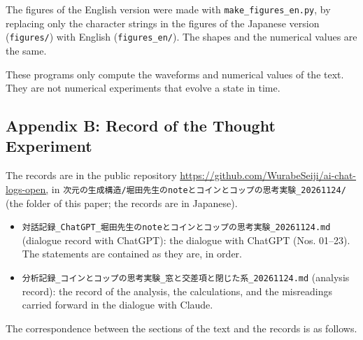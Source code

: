 \documentclass[
  a4paper,
]{article}
\providecommand{\tightlist}{%
  \setlength{\itemsep}{0pt}\setlength{\parskip}{0pt}}
\begin{document}
The figures of the English version were made with
\texttt{make\_\allowbreak{}figures\_\allowbreak{}en.py}, by replacing only the character strings
in the figures of the Japanese version (\texttt{figures/\allowbreak{}}) with English
(\texttt{figures\_\allowbreak{}en/\allowbreak{}}). The shapes and the numerical values are the
same.

These programs only compute the waveforms and numerical values of the
text. They are not numerical experiments that evolve a state in time.

\subsection{Appendix B: Record of the Thought
Experiment}\label{appendix-b-record-of-the-thought-experiment}

The records are in the public repository
\url{https://github.com/WurabeSeiji/ai-chat-logs-open,} in
\texttt{次元の生成構造/\allowbreak{}堀田先生のnoteとコインとコップの思考実験\_\allowbreak{}20261124/\allowbreak{}}
(the folder of this paper; the records are in Japanese).

\begin{itemize}
\tightlist
\item
  \texttt{対話記録\_\allowbreak{}ChatGPT\_\allowbreak{}堀田先生のnoteとコインとコップの思考実験\_\allowbreak{}20261124.md}
  (dialogue record with ChatGPT): the dialogue with ChatGPT (Nos.
  01--23). The statements are contained as they are, in order.
\item
  \texttt{分析記録\_\allowbreak{}コインとコップの思考実験\_\allowbreak{}窓と交差項と閉じた系\_\allowbreak{}20261124.md}
  (analysis record): the record of the analysis, the calculations, and
  the misreadings carried forward in the dialogue with Claude.
\end{itemize}

The correspondence between the sections of the text and the records is
as follows.
\end{document}
